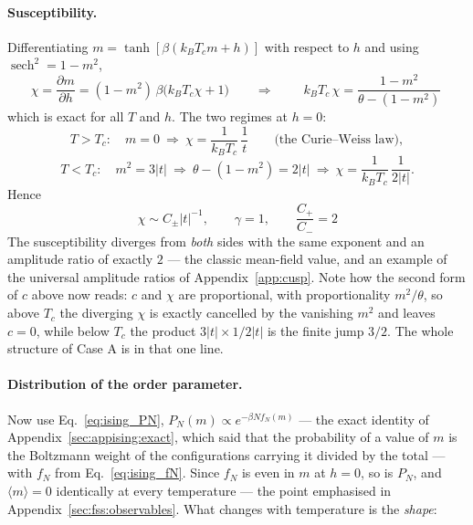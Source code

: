 \documentclass[10pt,a4paper]{article}
\theoremstyle{remark}
\begin{document}
\paragraph{Susceptibility.} Differentiating $m=\tanh[\beta(k_BT_cm+h)]$ with
respect to $h$ and using $\operatorname{sech}^{2}=1-m^{2}$,
\[
\chi=\frac{\partial m}{\partial h}=(1-m^{2})\,\beta\big(k_BT_c\chi+1\big)
\qquad\Longrightarrow\qquad
\;k_BT_c\,\chi=\frac{1-m^{2}}{\theta-(1-m^{2})}\
\]
which is exact for all $T$ and $h$. The two regimes at $h=0$:
\[
T>T_c:\quad m=0\ \Rightarrow\ \chi=\frac{1}{k_BT_c}\,\frac{1}{t}
\qquad\text{(the Curie--Weiss law)},
\]
\[
T<T_c:\quad m^{2}=3|t|\ \Rightarrow\
\theta-(1-m^{2})=2|t|\ \Rightarrow\
\chi=\frac{1}{k_BT_c}\,\frac{1}{2|t|} .
\]
Hence
\[
\;\chi\sim C_{\pm}|t|^{-1},\qquad \gamma=1,\qquad
\frac{C_+}{C_-}=2\
\]
The susceptibility diverges from \emph{both} sides with the same exponent and an
amplitude ratio of exactly $2$ --- the classic mean-field value, and an example of
the universal amplitude ratios of Appendix~\ref{app:cusp}.
Note how the second form of $c$ above now reads: $c$ and $\chi$ are
proportional, with proportionality $m^{2}/\theta$, so above $T_c$ the diverging
$\chi$ is exactly cancelled by the vanishing $m^{2}$ and leaves $c=0$, while below
$T_c$ the product $3|t|\times1/2|t|$ is the finite jump $3/2$. The whole structure
of Case A is in that one line.

\paragraph{Distribution of the order parameter.} Now use
Eq.~\eqref{eq:ising_PN}, $P_N(m)\propto e^{-\beta Nf_N(m)}$ --- the exact
identity of Appendix~\ref{sec:appising:exact}, which said that the probability of
a value of $m$ is the Boltzmann weight of the configurations carrying it divided
by the total --- with $f_N$ from Eq.~\eqref{eq:ising_fN}. Since $f_N$ is even in $m$ at $h=0$, so is
$P_N$, and $\langle m\rangle=0$ identically at every temperature --- the point
emphasised in Appendix~\ref{sec:fss:observables}. What changes with temperature is
the \emph{shape}:
\end{document}

